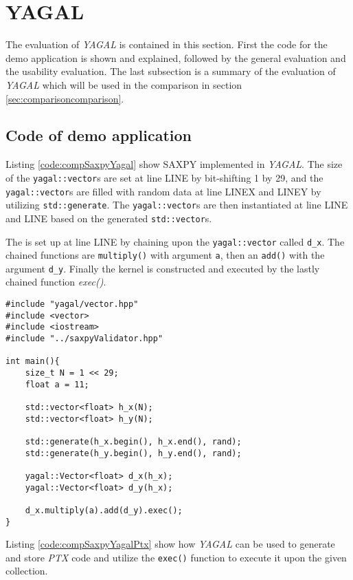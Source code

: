 \section{YAGAL}
The evaluation of \textit{YAGAL} is contained in this section. First the code for the demo application is shown and explained, followed by the general evaluation and the usability evaluation. The last subsection is a summary of the evaluation of \textit{YAGAL} which will be used in the comparison in section \ref{sec:comparisoncomparison}.

\subsection{Code of demo application}
Listing \ref{code:compSaxpyYagal} show SAXPY implemented in \textit{YAGAL}. The size of the \texttt{yagal::vector}s are set at line LINE by bit-shifting 1 by 29, and the \texttt{yagal::vector}s are filled with random data at line LINEX and LINEY by utilizing \texttt{std::generate}. The \texttt{yagal::vector}s are then instantiated at line LINE and LINE based on the generated \texttt{std::vector}s.

The is set up at line LINE by chaining upon the \texttt{yagal::vector} called \texttt{d\_x}. The chained functions are \texttt{multiply()} with argument \texttt{a}, then an \texttt{add()} with the argument \texttt{d\_y}. Finally the kernel is constructed and executed by the lastly chained function \textit{exec()}.

\begin{lstlisting}[caption={\textit{YAGAL} \textit{SAXPY}.}, label={code:compSaxpyYagal}]
#include "yagal/vector.hpp"
#include <vector>
#include <iostream>
#include "../saxpyValidator.hpp"

int main(){
    size_t N = 1 << 29;
    float a = 11;

    std::vector<float> h_x(N);
    std::vector<float> h_y(N);

    std::generate(h_x.begin(), h_x.end(), rand);
    std::generate(h_y.begin(), h_y.end(), rand);

    yagal::Vector<float> d_x(h_x);
    yagal::Vector<float> d_y(h_x);
    
    d_x.multiply(a).add(d_y).exec();
}
\end{lstlisting}

Listing \ref{code:compSaxpyYagalPtx} show how \textit{YAGAL} can be used to generate and store \textit{PTX} code and utilize the \texttt{exec()} function to execute it upon the given collection.

